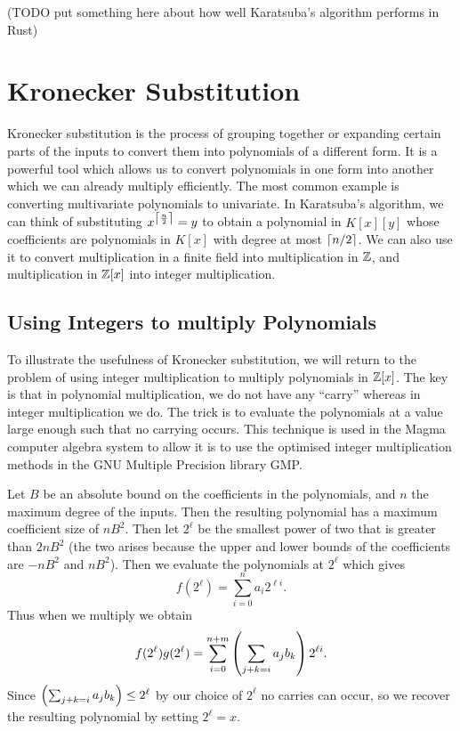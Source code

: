 (TODO put something here about how well Karatsuba's algorithm performs in Rust)

\section{Kronecker Substitution}%
\label{sub:kronecker_substitution}

Kronecker substitution is the process of grouping together or expanding certain parts of the inputs to convert them into polynomials of a different form. It is a powerful tool which allows us to convert polynomials in one form into another which we can already multiply efficiently. The most common example is converting multivariate polynomials to univariate. In Karatsuba's algorithm, we can think of substituting $x^{\left \lceil \frac{n}{2} \right \rceil} = y$ to obtain a polynomial in $K[x][y]$ whose coefficients are polynomials in $K[x]$ with degree at most $\left \lceil n/2 \right \rceil$. We can also use it to convert multiplication in a finite field into multiplication in ${\mathbb Z}$, and multiplication in ${\mathbb Z}[x]$ into integer multiplication.

\subsection{Using Integers to multiply Polynomials}%
\label{sub:Using Integers to multiply Polynomials}

To illustrate the usefulness of Kronecker substitution, we will return to the problem of using integer multiplication to multiply polynomials in ${\mathbb Z}[x]$. The key is that in polynomial multiplication, we do not have any ``carry'' whereas in integer multiplication we do. The trick is to evaluate the polynomials at a value large enough such that no carrying occurs. This technique is used in the Magma computer algebra system to allow it is to use the optimised integer multiplication methods in the GNU Multiple Precision library GMP.

Let $B$ be an absolute bound on the coefficients in the polynomials, and $n$ the maximum degree of the inputs. Then the resulting polynomial has a maximum coefficient size of $nB^2$. Then let $2^\ell$ be the smallest power of two that is greater than $2nB^2$ (the two arises because the upper and lower bounds of the coefficients are $-nB^2$ and $nB^2$). Then we evaluate the polynomials at $2^\ell$ which gives
\[
    f(2^\ell) = \sum^n_{i = 0} a_i 2^{\ell i}.
\]
Thus when we multiply we obtain
\[
    f(2^\ell)g(2^\ell) = \sum^{n+m}_{i=0} \left(\sum_{j + k = i} a_jb_k\right)2^{\ell i}.
\]
Since $\left(\sum_{j + k = i}a_j b_k\right) \leq 2^{\ell}$ by our choice of $2^\ell$ no carries can occur, so we recover the resulting polynomial by setting $2^\ell = x$.

